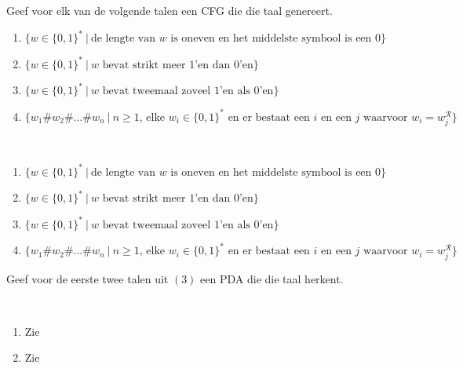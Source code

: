 \documentclass[a4paper]{article}
\begin{document}
\begin{question}
Geef voor elk van de volgende talen een CFG die die taal genereert.
\begin{enumerate}
 \item $\{ w \in \{0,1\}^* \ | \ \text{de lengte van $w$ is oneven en het middelste symbool is een $0$} \}$
 \item $\{ w \in \{0,1\}^* \ | \ \text{$w$ bevat strikt meer $1$'en dan $0$'en} \}$
 \item $\{ w \in \{0,1\}^* \ | \ \text{$w$ bevat tweemaal zoveel $1$'en als $0$'en} \}$
 \item $\{ w_1 \# w_2 \# \ldots \# w_n \ | \ \text{$n \geq 1$, elke $w_i \in \{0,1\}^*$ en er bestaat een $i$ en een $j$ waarvoor $w_i = w_j^\mathcal{R}$} \}$
\end{enumerate}

\begin{answer}~~
\begin{enumerate}
 \item $\{ w \in \{0,1\}^* \ | \ \text{de lengte van $w$ is oneven en het middelste symbool is een $0$} \}$
 \item $\{ w \in \{0,1\}^* \ | \ \text{$w$ bevat strikt meer $1$'en dan $0$'en} \}$
 \item $\{ w \in \{0,1\}^* \ | \ \text{$w$ bevat tweemaal zoveel $1$'en als $0$'en} \}$
 \item $\{ w_1 \# w_2 \# \ldots \# w_n \ | \ \text{$n \geq 1$, elke $w_i \in \{0,1\}^*$ en er bestaat een $i$ en een $j$ waarvoor $w_i = w_j^\mathcal{R}$} \}$
\end{enumerate}
\end{answer}
\end{question}

\begin{question}
Geef voor de eerste twee talen uit $(3)$ een PDA die die taal herkent.

\begin{answer}~~
\begin{enumerate}
 \item Zie 
 \item Zie 
\end{enumerate}
\end{answer}
\end{question}
\end{document}
